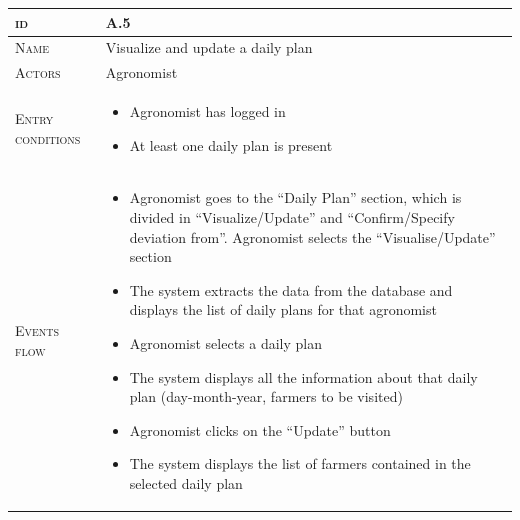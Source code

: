 

\begin{table}[H]
    \centering
    \begin{tabular}[c]{|l|p{}|}
        \hline %
    	\textsc{id}                 &   A.5\\
    	\hline %
    	\textsc{Name}               &   Visualize and update a daily plan\\
    	\hline %
    	\textsc{Actors}             &   Agronomist\\
    	\hline %
    	\textsc{Entry conditions}   &   \begin{itemize}
                                    	    \item Agronomist has logged in
                                    	    \item At least one daily plan is present
                                        \end{itemize}\\
    	\hline %
    	\textsc{Events flow}         &   %
            	                        \begin{itemize}
                                    	    \item Agronomist goes to the “Daily Plan” section, which is divided in “Visualize/Update” and “Confirm/Specify deviation from”. Agronomist selects the “Visualise/Update” section
                                    		\item The system extracts the data from the database and displays the list of daily plans for that agronomist
                                    		\item Agronomist selects a daily plan
                                    		\item The system displays all the information about that daily plan (day-month-year, farmers to be visited)
                                    		\item Agronomist clicks on the “Update” button
                                    		\item The system displays the list of farmers contained in the selected daily plan

\end{itemize}
\end{tabular}
\end{table}

